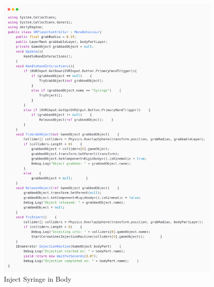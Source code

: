 \begin{figure}[h] 
	\centering
	\includegraphics[width=1\textwidth, height=0.7\textheight]{Images/inject syringe.png}
	\caption{Inject Syringe in Body}
	\label{fig:Inject Syringe in Body}
\end{figure}
\newpage
{}
\newline
